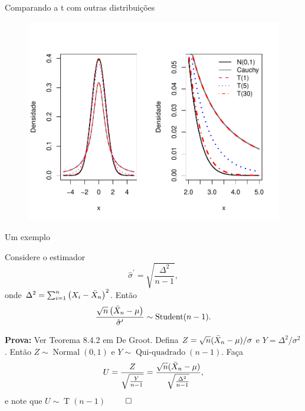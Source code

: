 \begin{frame}{Comparando a t com outras distribuições}
\begin{figure}[!ht]
 \begin{center}
  \includegraphics[scale=.6]{figures/comparacao_t_Student.pdf}
 \end{center}
\end{figure} 
\end{frame}

\begin{frame}{Um exemplo}
\begin{theo}
 Considere o estimador 
 \begin{equation*}
  \hat{\sigma}^\prime = \sqrt{\frac{\Delta^2}{n-1}},
 \end{equation*}
onde $\Delta^2 = \sum_{i=1}^n \left(X_i - \bar{X}_n\right)^2$.
Então 
\begin{equation*}
 \frac{\sqrt{n}\left(\bar{X}_n - \mu\right)}{\hat{\sigma}^\prime} \sim \operatorname{Student}(n-1).
\end{equation*}
\end{theo}
\textbf{Prova:}
Ver Teorema 8.4.2 em De Groot.
Defina $Z = \sqrt{n}(\bar{X}_n - \mu)/\sigma$ e $Y = \Delta^2/\sigma^2$.
Então $Z \sim\operatorname{Normal}(0,1)$ e $Y\sim\operatorname{Qui-quadrado}(n-1)$.
Faça
\begin{equation}
 U = \frac{Z}{\sqrt{\frac{Y}{n-1}}} = \frac{\sqrt{n}(\bar{X}_n-\mu)}{\sqrt{\frac{\Delta^2}{n-1}}},
\end{equation}
e note que $U \sim \operatorname{T}(n-1)$  $\qed$
\end{frame}

